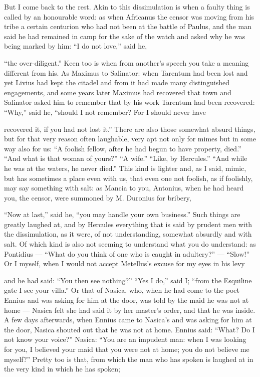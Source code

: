  But I come back to the rest. Akin to this dissimulation is when a faulty thing is called by an honourable word: as when Africanus the censor was moving from his tribe a certain centurion who had not been at the battle of Paulus, and the man said he had remained in camp for the sake of the watch and asked why he was being marked by him: ``I do not love,'' said he,

 ``the over-diligent.'' Keen too is when from another's speech you take a meaning different from his. As Maximus to Salinator: when Tarentum had been lost and yet Livius had kept the citadel and from it had made many distinguished engagements, and some years later Maximus had recovered that town and Salinator asked him to remember that by his work Tarentum had been recovered: ``Why,'' said he, ``should I not remember? For I should never have

 recovered it, if you had not lost it.'' There are also those somewhat absurd things, but for that very reason often laughable, very apt not only for mimes but in some way also for us: ``A foolish fellow, after he had begun to have property, died.'' ``And what is that woman of yours?'' ``A wife.'' ``Like, by Hercules.'' ``And while he was at the waters, he never died.'' This kind is lighter and, as I said, mimic, but has sometimes a place even with us, that even one not foolish, as if foolishly, may say something with salt: as Mancia to you, Antonius, when he had heard you, the censor, were summoned by M. Duronius for bribery,

 ``Now at last,'' said he, ``you may handle your own business.'' Such things are greatly laughed at, and by Hercules everything that is said by prudent men with the dissimulation, as it were, of not understanding, somewhat absurdly and with salt. Of which kind is also not seeming to understand what you do understand: as Pontidius — ``What do you think of one who is caught in adultery?'' — ``Slow!'' Or I myself, when I would not accept Metellus's excuse for my eyes in his levy

 and he had said: ``You then see nothing?'' ``Yes I do,'' said I; ``from the Esquiline gate I see your villa.'' Or that of Nasica, who, when he had come to the poet Ennius and was asking for him at the door, was told by the maid he was not at home — Nasica felt she had said it by her master's order, and that he was inside. A few days afterwards, when Ennius came to Nasica's and was asking for him at the door, Nasica shouted out that he was not at home. Ennius said: ``What? Do I not know your voice?'' Nasica: ``You are an impudent man: when I was looking for you, I believed your maid that you were not at home; you do not believe me myself?'' Pretty too is that, from which the man who has spoken is laughed at in the very kind in which he has spoken;

